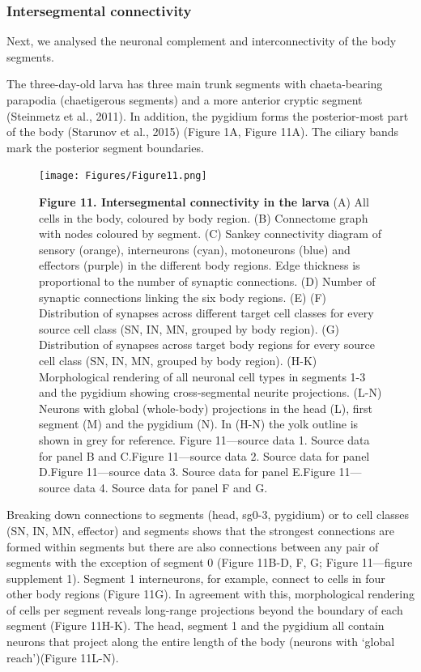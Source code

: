 \documentclass[
  11pt,
]{article}
\begin{document}
\subsubsection{Intersegmental
connectivity}\label{intersegmental-connectivity}

Next, we analysed the neuronal complement and interconnectivity of the
body segments.

The three-day-old larva has three main trunk segments with
chaeta-bearing parapodia (chaetigerous segments) and a more anterior
cryptic segment (Steinmetz et al., 2011). In addition, the pygidium
forms the posterior-most part of the body (Starunov et al., 2015)
(Figure 1A, Figure 11A). The ciliary bands mark the posterior segment
boundaries.

\begin{figure}[H]

{\centering \texttt{[image: Figures/Figure11.png]}

}

\caption{\textbf{Figure 11. Intersegmental connectivity in the larva }
(A) All cells in the body, coloured by body region. (B) Connectome graph
with nodes coloured by segment. (C) Sankey connectivity diagram of
sensory (orange), interneurons (cyan), motoneurons (blue) and effectors
(purple) in the different body regions. Edge thickness is proportional
to the number of synaptic connections. (D) Number of synaptic
connections linking the six body regions. (E) (F) Distribution of
synapses across different target cell classes for every source cell
class (SN, IN, MN, grouped by body region). (G) Distribution of synapses
across target body regions for every source cell class (SN, IN, MN,
grouped by body region). (H-K) Morphological rendering of all neuronal
cell types in segments 1-3 and the pygidium showing cross-segmental
neurite projections. (L-N) Neurons with global (whole-body) projections
in the head (L), first segment (M) and the pygidium (N). In (H-N) the
yolk outline is shown in grey for reference. Figure 11---source data 1.
Source data for panel B and C.Figure 11---source data 2. Source data for
panel D.Figure 11---source data 3. Source data for panel E.Figure
11---source data 4. Source data for panel F and G.}

\end{figure}%

Breaking down connections to segments (head, sg0-3, pygidium) or to cell
classes (SN, IN, MN, effector) and segments shows that the strongest
connections are formed within segments but there are also connections
between any pair of segments with the exception of segment 0 (Figure
11B-D, F, G; Figure 11---figure supplement 1). Segment 1 interneurons,
for example, connect to cells in four other body regions (Figure 11G).
In agreement with this, morphological rendering of cells per segment
reveals long-range projections beyond the boundary of each segment
(Figure 11H-K). The head, segment 1 and the pygidium all contain neurons
that project along the entire length of the body (neurons with `global
reach')(Figure 11L-N).
\end{document}
